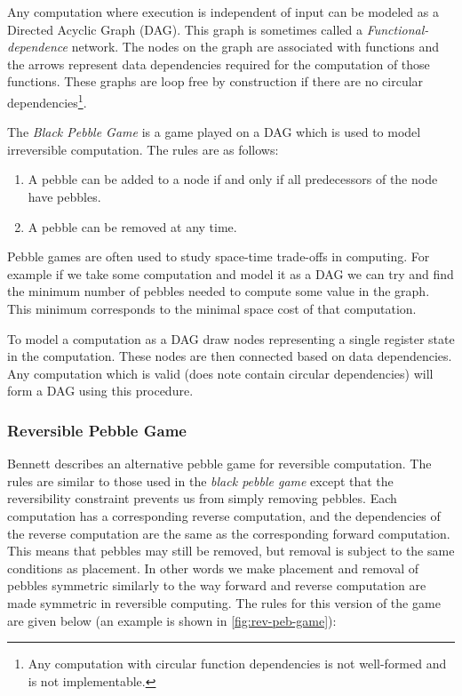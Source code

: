 Any computation where execution is independent of input can be modeled as a
Directed Acyclic Graph (DAG). This graph is sometimes called a
\emph{Functional-dependence} network.  The nodes on the graph are associated
with functions and the arrows represent data dependencies required for the
computation of those functions. These graphs are loop free by construction if
there are no circular dependencies\footnote{Any computation with circular
function dependencies is not well-formed and is not implementable.}.

The \emph{Black Pebble Game} is a game played on a DAG which is used to model
irreversible computation. The rules are as follows:

\begin{enumerate}
  \item A pebble can be added to a node if and only if all predecessors of the
    node have pebbles.
  \item A pebble can be removed at any time.
\end{enumerate}

Pebble games are often used to study space-time trade-offs in computing. For
example if we take some computation and model it as a DAG we can try and find
the minimum number of pebbles needed to compute some value in the graph. This
minimum corresponds to the minimal space cost of that computation.

To model a computation as a DAG draw nodes representing a single register state
in the computation.  These nodes are then connected based on data dependencies.
Any computation which is valid (does note contain circular dependencies) will
form a DAG using this procedure.

\subsubsection{Reversible Pebble Game}

Bennett\cite{Bennett:89} describes an alternative pebble game for reversible
computation. The rules are similar to those used in the \emph{black pebble
game} except that the reversibility constraint prevents us from simply removing
pebbles. Each computation has a corresponding reverse computation, and the
dependencies of the reverse computation are the same as the corresponding
forward computation. This means that pebbles may still be removed, but removal
is subject to the same conditions as placement. In other words we make
placement and removal of pebbles symmetric similarly to the way forward and
reverse computation are made symmetric in reversible computing.  The rules for
this version of the game are given below (an example is shown in
\cref{fig:rev-peb-game}):

